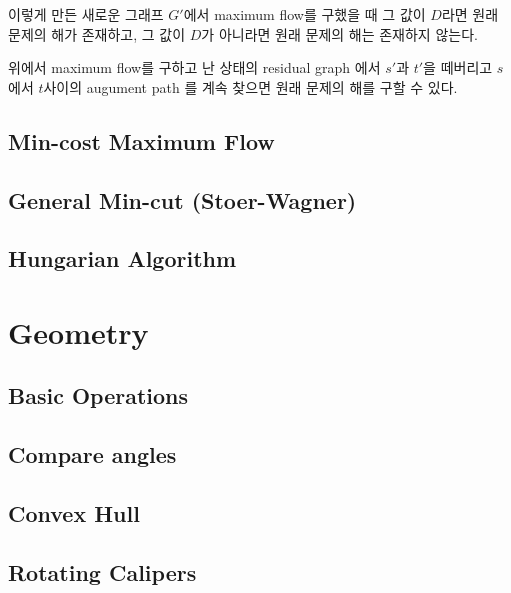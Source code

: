 \documentclass[10pt,landscape,a4paper,twocolumn]{article}
\begin{document}
이렇게 만든 새로운 그래프 $G'$에서 maximum flow를 구했을 때 그 값이 $D$라면 원래 문제의 해가 존재하고, 그 값이 $D$가 아니라면 원래 문제의 해는 존재하지 않는다.

위에서 maximum flow를 구하고 난 상태의 residual graph 에서 $s'$과 $t'$을 떼버리고 $s$에서 $t$사이의 augument path 를 계속 찾으면 원래 문제의 해를 구할 수 있다. 


\subsection{Min-cost Maximum Flow}


\subsection{General Min-cut (Stoer-Wagner)}


\subsection{Hungarian Algorithm}


\section{Geometry}

\subsection{Basic Operations}


\subsection{Compare angles}

\subsection{Convex Hull}


\subsection{Rotating Calipers}

\end{document}
